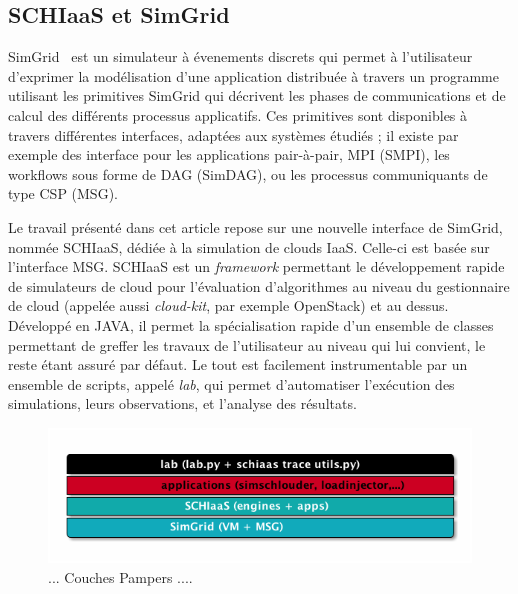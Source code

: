 \documentclass[parallelisme]{compas2017}
\begin{document}
\subsection{SCHIaaS et SimGrid}


SimGrid~\cite{simgrid}  est un  simulateur à  évenements discrets  qui permet  à
l'utilisateur d'exprimer la modélisation  d'une application distribuée à travers
un  programme utilisant  les  primitives  SimGrid qui  décrivent  les phases  de
communications et de calcul des différents processus applicatifs. Ces primitives
sont disponibles à travers différentes interfaces, adaptées aux systèmes étudiés
; il  existe par exemple  des interface  pour les applications  pair-à-pair, MPI
(SMPI), les workflows sous forme de DAG (SimDAG), ou les processus communiquants
de type CSP (MSG).

Le  travail présenté  dans  cet article  repose sur  une  nouvelle interface  de
SimGrid, nommée  SCHIaaS, dédiée à la  simulation de clouds IaaS.   Celle-ci est
basée  sur l'interface  MSG.  SCHIaaS  est un  \textit{framework} permettant  le
développement rapide de simulateurs de  cloud pour l'évaluation d'algorithmes au
niveau du gestionnaire  de cloud (appelée aussi  \textit{cloud-kit}, par exemple
OpenStack) et au dessus.  Développé en  JAVA, il permet la spécialisation rapide
d'un ensemble de  classes permettant de greffer les travaux  de l'utilisateur au
niveau  qui  lui convient,  le  reste  étant assuré  par  défaut.   Le tout  est
facilement instrumentable  par un  ensemble de  scripts, appelé  \emph{lab}, qui
permet  d'automatiser  l'exécution  des   simulations,  leurs  observations,  et
l'analyse des résultats.

\begin{figure}[hbt]
\includegraphics[scale=0.8]{gfx/framework.png}
\caption{ ... Couches Pampers ....}
\label{sec:framework}
\end{figure}

\end{document}
